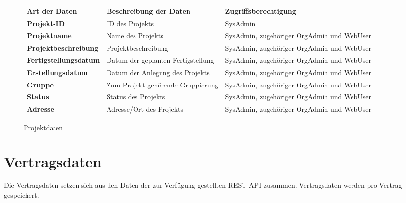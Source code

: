 \begin{figure}[h]
	\centering
	\begin{tabularx}{\textwidth}{| X || X | X |}
        \hline
		\textbf{Art der Daten} & \textbf{Beschreibung der Daten} & \textbf{Zugriffsberechtigung} \\ \hline \hline
        \textbf{Projekt-ID} & ID des Projekts & SysAdmin \\ \hline
		\textbf{Projektname} & Name des Projekts & SysAdmin, zugehöriger OrgAdmin und WebUser \\ \hline
		\textbf{Projektbeschreibung} & Projektbeschreibung & SysAdmin, zugehöriger OrgAdmin und WebUser \\ \hline
		\textbf{Fertigstellungsdatum} & Datum der geplanten Fertigstellung & SysAdmin, zugehöriger OrgAdmin und WebUser \\ \hline
        \textbf{Erstellungsdatum} & Datum der Anlegung des Projekts & SysAdmin, zugehöriger OrgAdmin und WebUser \\ \hline
        \textbf{Gruppe} & Zum Projekt gehörende Gruppierung & SysAdmin, zugehöriger OrgAdmin und WebUser \\ \hline
        \textbf{Status} & Status des Projekts & SysAdmin, zugehöriger OrgAdmin und WebUser \\ \hline
        \textbf{Adresse} & Adresse/Ort des Projekts & SysAdmin, zugehöriger OrgAdmin und WebUser \\ \hline
	\end{tabularx}
	\caption{Projektdaten}
	\label{fig:Projektdaten}
\end{figure}

\section{Vertragsdaten}

Die Vertragsdaten setzen sich aus den Daten der zur Verf\"ugung gestellten REST-API zusammen. Vertragsdaten werden pro Vertrag gespeichert.

